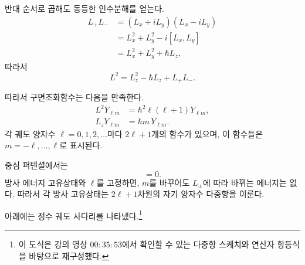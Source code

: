 반대 순서로 곱해도 동등한 인수분해를 얻는다.
\begin{align}
L_+L_-
&=(L_x+iL_y)(L_x-iL_y) \\
&=L_x^2+L_y^2-i[L_x,L_y] \\
&=L_x^2+L_y^2+\hbar L_z,
\end{align}
따라서
\begin{equation}
L^2=L_z^2-\hbar L_z+L_+L_-.
\end{equation}

\begin{classroomqa}\end{classroomqa}

따라서 구면조화함수는 다음을 만족한다.
\begin{align}
L^2Y_{\ell m}
&=\hbar^2\ell(\ell+1)Y_{\ell m}, \\
L_zY_{\ell m}
&=\hbar m\,Y_{\ell m}.
\end{align}
각 궤도 양자수 \(\ell=0,1,2,\ldots\)마다 \(2\ell+1\)개의 함수가 있으며, 이 함수들은 \(m=-\ell,\ldots,\ell\)로 표시된다.

중심 퍼텐셜에서는
\begin{equation}
[H,L_i]=0.
\end{equation}
방사 에너지 고유상태와 \(\ell\)를 고정하면, \(m\)를 바꾸어도 \(L_\pm\)에 따라 바뀌는 에너지는 없다. 따라서 각 방사 고유상태는 \(2\ell+1\)차원의 자기 양자수 다중항을 이룬다.

아래에는 정수 궤도 사다리를 나타냈다.\footnote{이 도식은 강의 영상 \(00{:}35{:}53\)에서 확인할 수 있는 다중항 스케치와 연산자 항등식을 바탕으로 재구성했다.}

